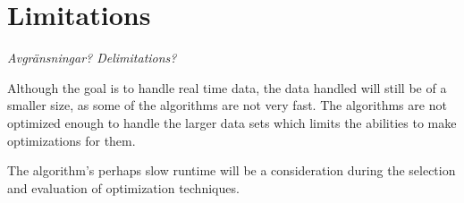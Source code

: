 
\section{Limitations}\label{sec:intro:limitations}

\textit{Avgränsningar? Delimitations?}

Although the goal is to handle real time data, the data handled will still be of a smaller size, as some of the algorithms are not very fast. The algorithms are not optimized enough to handle the larger data sets which limits the abilities to make optimizations for them.

The algorithm's perhaps slow runtime will be a consideration during the selection and evaluation of optimization techniques.
